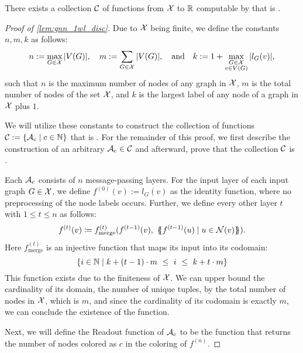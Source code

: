 \begin{lemma}\label{lem:gnn_1wl_disc}
    There exists a collection $\mathcal{C}$ of functions from $\mathcal{X}$ to $\mathbb{R}$ computable by \gnns that is \wldisc.
\end{lemma}

\begin{proof}[Proof of \cref{lem:gnn_1wl_disc}]
    Due to $\mathcal{X}$ being finite, we define the constants $n, m, k$ as follows:
    \begin{equation*}
        n := \max_{G \in \mathcal{X}} |V(G)|, \quad  m := \sum_{G \in \mathcal{X}} |V(G)|, \quad\text{and}\quad k := 1 + \max_{\substack{G \in \mathcal{X} \\ v \in V(G)}} |l_G(v)|,
    \end{equation*}
    such that $n$ is the maximum number of nodes of any graph in $\mathcal{X}$, $m$ is the total number of nodes of the set $\mathcal{X}$, and $k$ is the largest label of any node of a graph in $\mathcal{X}$ plus $1$.

    We will utilize these constants to construct the collection of functions $\mathcal{C} := \{ \mathcal{A}_c \mid c \in \mathbb{N} \}$ that is \wldisc. For the remainder of this proof, we first describe the construction of an arbitrary $\mathcal{A}_c \in \mathcal{C}$ and afterward, prove that the collection $\mathcal{C}$ is \wldisc.

    Each $\mathcal{A}_c$ consists of $n$ message-passing layers. For the input layer of each input graph $G \in \mathcal{X}$, we define $f^{(0)}(v) := l_G(v)$ as the identity function, where no preprocessing of the node labels occurs. Further, we define every other layer $t$ with $1 \leq t \leq n$ as follows:
    \begin{align*}
        f^{(t)}(v) \coloneqq f^{(t)}_{\text{merge}}(f^{(t-1)}(v), \ \MSopen f^{(t-1)}(u) \mid u \in \cN(v)\MSclose).
    \end{align*}
    Here $f^{(t)}_{\text{merge}}$ is an injective function that maps its input into its codomain:
    \begin{equation*}
       \{ i \in \Nb \mid k + (t-1) \cdot m \ \leq \  i \ \leq \ k + t \cdot m \}
    \end{equation*}
    This function exists due to the finiteness of $\mathcal{X}$. We can upper bound the cardinality of its domain, the number of unique tuples, by the total number of nodes in $\mathcal{X}$, which is $m$, and since the cardinality of its codomain is exactly $m$, we can conclude the existence of the function.

    Next, we will define the \textsf{Readout} function of $\mathcal{A}_c$ to be the function that returns the number of nodes colored as $c$ in the coloring of $f^{(n)}$.
    

\end{proof}
